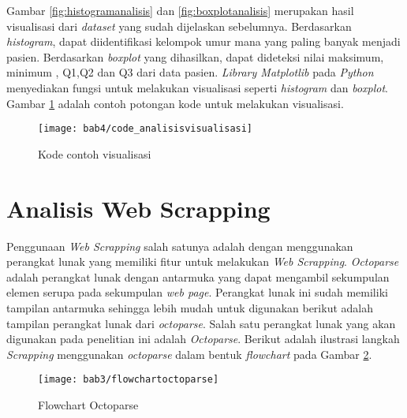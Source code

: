 Gambar \ref{fig:histogramanalisis} dan \ref{fig:boxplotanalisis} merupakan hasil visualisasi dari \textit{dataset} yang sudah dijelaskan sebelumnya. Berdasarkan \textit{histogram}, dapat diidentifikasi kelompok umur mana yang paling banyak menjadi pasien. Berdasarkan \textit{boxplot} yang dihasilkan, dapat dideteksi nilai maksimum, minimum , Q1,Q2 dan Q3 dari data pasien. \textit{Library Matplotlib} pada \textit{Python} menyediakan fungsi untuk melakukan visualisasi seperti \textit{histogram} dan \textit{boxplot}. Gambar \ref{fig:code_analisisvisualisasi} adalah contoh potongan kode untuk melakukan visualisasi.


%
%
%

\begin{figure}[H]
	\centering  
	\texttt{[image: bab4/code\_analisisvisualisasi]}   
	\caption{Kode contoh visualisasi }
	\label{fig:code_analisisvisualisasi} 
\end{figure} 




\section{Analisis Web Scrapping}
\label{chap:analisiswebscraping}
Penggunaan \textit{Web Scrapping} salah satunya adalah dengan menggunakan perangkat lunak yang memiliki fitur untuk melakukan \textit{Web Scrapping}. \textit{Octoparse} adalah perangkat lunak dengan antarmuka yang dapat mengambil sekumpulan elemen serupa pada sekumpulan \textit{web page}. Perangkat lunak ini sudah memiliki tampilan antarmuka sehingga lebih mudah untuk digunakan berikut adalah tampilan perangkat lunak dari \textit{octoparse}. Salah satu perangkat lunak yang akan digunakan pada penelitian ini adalah \textit{Octoparse}. Berikut adalah ilustrasi langkah \textit{Scrapping} menggunakan \textit{octoparse} dalam bentuk \textit{flowchart} pada Gambar \ref{fig:flowchartoctoparse}.


\begin{figure}[H]
	\centering  
	\texttt{[image: bab3/flowchartoctoparse]}   
	\caption{Flowchart Octoparse}
	\label{fig:flowchartoctoparse} 
\end{figure} 


